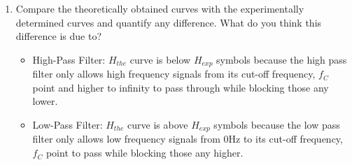 \documentclass{article}
\begin{document}
\begin{center}
  \begin{enumerate}
    \item Compare the theoretically obtained curves with the experimentally determined curves and quantify any difference. What do you think this difference is due to?
    \begin{itemize}
      \item High-Pass Filter: \(H_{the}\) curve is below \(H_{exp}\) symbols because the high pass filter only allows high frequency signals from its cut-off frequency, \(f_C\) point and higher to infinity to pass through while blocking those any lower.
      \item Low-Pass Filter: \(H_{the}\) curve is above \(H_{exp}\) symbols because the low pass filter only allows low frequency signals from 0Hz to its cut-off frequency, \(f_C\) point to pass while blocking those any higher.
    \end{itemize}
  \end{enumerate}
\end{center}
\end{document}
